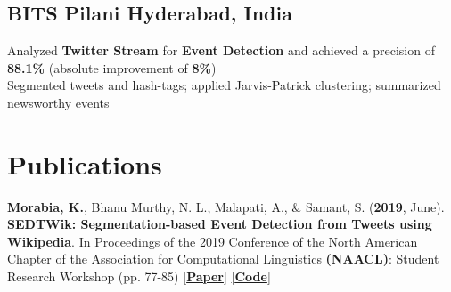 \documentclass[]{Keval-resume}
\begin{document}
\subsection{BITS Pilani \hfill \normalfont Hyderabad, India}
\textbullet{} Analyzed \textbf{Twitter Stream} for \textbf{Event Detection} and achieved a precision of \textbf{88.1\%} (absolute improvement of \textbf{8\%}) \\
\textbullet{} Segmented tweets and hash-tags; applied Jarvis-Patrick clustering; summarized newsworthy events 
\sectionsep



\section{Publications} 
\hrulefill
\postsectionsep 

\textbf{Morabia, K.}, Bhanu Murthy, N. L., Malapati, A., \& Samant, S. (\textbf{2019}, June). \textbf{SEDTWik: Segmentation-based Event Detection from Tweets using Wikipedia}. In Proceedings of the 2019 Conference of the North American Chapter of the Association for Computational Linguistics \textbf{(NAACL)}: Student Research Workshop (pp. 77-85) \href{https://www.aclweb.org/anthology/N19-3011/}{[\textbf{Paper}]} \href{https://github.com/kevalmorabia97/SEDTWik-Event-Detection-from-Tweets}{[\textbf{Code}]}
\sectionsep
\end{document}
